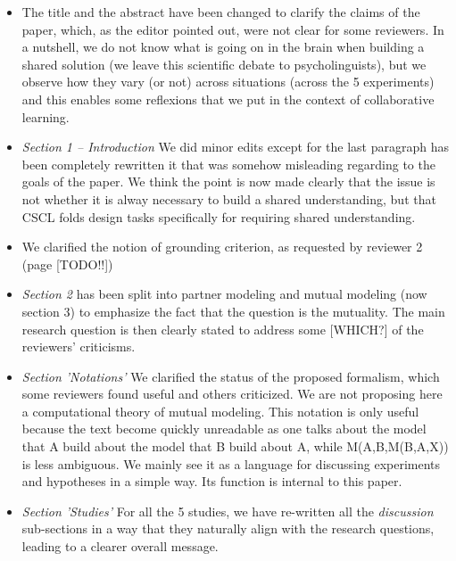 \documentclass{article}
\begin{document}
\begin{itemize}

    \item The title and the abstract have been changed to clarify the
        claims of the paper, which, as the editor pointed out, were not clear
        for some reviewers. In a nutshell, we do not know what is going on in the
        brain when building a shared solution (we leave this scientific debate
        to psycholinguists), but we observe how they vary (or not) across
        situations (across the 5 experiments) and this enables some reflexions
        that we put in the context of collaborative learning.

    \item \emph{Section 1 -- Introduction} We did minor edits except for the last
        paragraph has been completely rewritten it  that was somehow misleading
        regarding to the goals of the paper.  We think the point is now made
        clearly that the issue is not whether it is alway necessary to build a
        shared understanding, but that CSCL folds design tasks specifically for
        requiring shared understanding.

    \item We clarified the notion of grounding criterion, as requested by
        reviewer 2 (page [TODO!!])

    \item \emph{Section 2} has been split into partner modeling and mutual modeling (now
        section 3) to emphasize the fact that the question is the mutuality. The
        main research question is then clearly stated to address some [WHICH?] of the
        reviewers' criticisms.

    \item \emph{Section 'Notations'} We clarified the status of the proposed formalism, which some
        reviewers found useful and others criticized. We are not
        proposing here a computational theory of mutual modeling. This notation is
        only useful because the text become quickly unreadable as one talks about
        the model that A build about the model that B build about A, while
        M(A,B,M(B,A,X)) is less ambiguous. We mainly see it as a language for discussing
        experiments and hypotheses in a simple way. Its function is internal to
        this paper.

    \item \emph{Section 'Studies'} For all the 5 studies, we have re-written all
        the \emph{discussion} sub-sections in a
        way that they naturally align with the research questions, leading to a
        clearer overall message.


\end{itemize}
\end{document}
